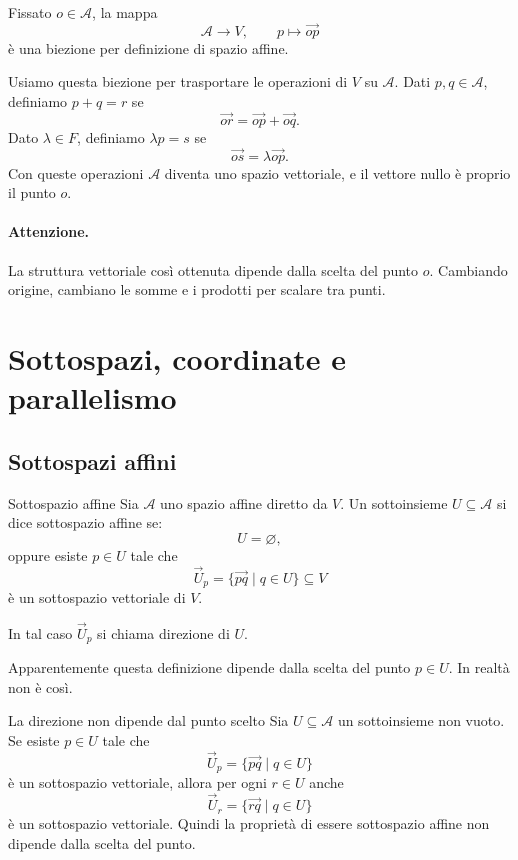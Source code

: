\documentclass[a4paper]{article}
\begin{document}
\begin{snippetproof}{}
    Fissato \(o\in\mathcal{A}\), la mappa
    \[
        \mathcal{A}\to V,
        \qquad
        p\mapsto\overrightarrow{op}
    \]
    è una biezione per definizione di spazio affine.

    Usiamo questa biezione per trasportare le operazioni di \(V\) su \(\mathcal{A}\). Dati \(p,q\in\mathcal{A}\), definiamo \(p+q=r\) se
    \[
        \overrightarrow{or}
        =
        \overrightarrow{op}
        +
        \overrightarrow{oq}.
    \]
    Dato \(\lambda\in F\), definiamo \(\lambda p=s\) se
    \[
        \overrightarrow{os}
        =
        \lambda\overrightarrow{op}.
    \]
    Con queste operazioni \(\mathcal{A}\) diventa uno spazio vettoriale, e il vettore nullo è proprio il punto \(o\).
\end{snippetproof}

\paragraph{Attenzione.}
La struttura vettoriale così ottenuta dipende dalla scelta del punto \(o\). Cambiando origine, cambiano le somme e i prodotti per scalare tra punti.

\section{Sottospazi, coordinate e parallelismo}

\subsection{Sottospazi affini}

\begin{snippetdefinition}{Sottospazio affine}
    Sia \(\mathcal{A}\) uno spazio affine diretto da \(V\). Un sottoinsieme \(U\subseteq\mathcal{A}\) si dice sottospazio affine se:
    \[
        U=\varnothing,
    \]
    oppure esiste \(p\in U\) tale che
    \[
        \overrightarrow{U}_p
        =
        \{\overrightarrow{pq}\mid q\in U\}
        \subseteq V
    \]
    è un sottospazio vettoriale di \(V\).

    In tal caso \(\overrightarrow{U}_p\) si chiama direzione di \(U\).
\end{snippetdefinition}

Apparentemente questa definizione dipende dalla scelta del punto \(p\in U\). In realtà non è così.

\begin{snippetproposition}{La direzione non dipende dal punto scelto}
    Sia \(U\subseteq\mathcal{A}\) un sottoinsieme non vuoto. Se esiste \(p\in U\) tale che
    \[
        \overrightarrow{U}_p
        =
        \{\overrightarrow{pq}\mid q\in U\}
    \]
    è un sottospazio vettoriale, allora per ogni \(r\in U\) anche
    \[
        \overrightarrow{U}_r
        =
        \{\overrightarrow{rq}\mid q\in U\}
    \]
    è un sottospazio vettoriale. Quindi la proprietà di essere sottospazio affine non dipende dalla scelta del punto.
\end{snippetproposition}
\end{document}
